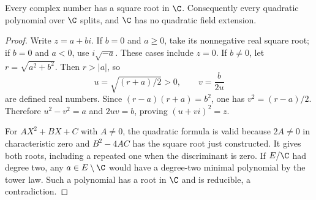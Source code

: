 \begin{lemma}\label{lem:complex-square-root-algebraic}
Every complex number has a square root in $\C$. Consequently every quadratic polynomial over $\C$ splits, and $\C$ has no quadratic field extension.
\end{lemma}
\begin{proof}
Write $z=a+bi$. If $b=0$ and $a\geq0$, take its nonnegative real square root; if $b=0$ and $a<0$, use $i\sqrt{-a}$. These cases include $z=0$. If $b\ne0$, let $r=\sqrt{a^2+b^2}$. Then $r>|a|$, so
\[u=\sqrt{(r+a)/2}>0,\qquad v=\frac{b}{2u}\]
are defined real numbers. Since $(r-a)(r+a)=b^2$, one has $v^2=(r-a)/2$. Therefore $u^2-v^2=a$ and $2uv=b$, proving $(u+vi)^2=z$.

For $AX^2+BX+C$ with $A\ne0$, the quadratic formula is valid because $2A\ne0$ in characteristic zero and $B^2-4AC$ has the square root just constructed. It gives both roots, including a repeated one when the discriminant is zero. If $E/\C$ had degree two, any $a\in E\setminus\C$ would have a degree-two minimal polynomial by the tower law. Such a polynomial has a root in $\C$ and is reducible, a contradiction.
\end{proof}

